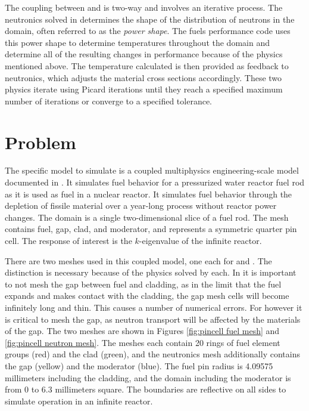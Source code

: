 The coupling between \rattlesnake{} and \bison{} is two-way and involves an iterative process.  The neutronics
solved in \rattlesnake{} determines the shape of the distribution of neutrons in the domain, often referred to
as the \emph{power shape}.  The fuels performance code uses this power shape to determine temperatures
throughout the domain and determine all of the resulting changes in performance because of the physics
mentioned above.  The temperature calculated is then provided as feedback to neutronics, which adjusts the
material cross sections accordingly.  These two physics iterate using Picard iterations until they reach a
specified maximum number of iterations or converge to a specified tolerance.

\section{Problem}

The specific model to simulate is a coupled multiphysics engineering-scale model documented in \cite{physormammoth}.  
It simulates fuel behavior for a pressurized
water reactor fuel rod as it is used as fuel in a nuclear reactor.  It simulates fuel behavior through the 
depletion of fissile material over a year-long process without reactor power changes.
The domain is a single two-dimensional slice of a fuel rod.  The mesh contains fuel, gap, clad, and
moderator, and represents a symmetric quarter pin cell.  
The response of interest is the $k$-eigenvalue of the infinite reactor.

There are two meshes used in this coupled model, one each for \bison{} and \rattlesnake{}.  The distinction is
necessary because of the physics solved by each.  In \bison{} it is important to not mesh the gap between fuel
and cladding, as in the limit that the fuel expands and makes contact with the cladding, the gap mesh cells
will become infinitely long and thin.  This causes a number of numerical errors.  For \rattlesnake{} however
it is critical to mesh the gap, as neutron transport will be affected by the materials of the gap.  The two
meshes are shown in Figures \ref{fig:pincell fuel mesh} and \ref{fig:pincell neutron mesh}.
The meshes each contain 20 rings of fuel element groups (red) and the clad (green),
and the neutronics mesh additionally contains the gap (yellow) and the moderator (blue).  
The fuel pin radius is 4.09575 millimeters including the cladding, and the domain including the moderator is
from 0 to 6.3 millimeters square.  The boundaries are reflective on all sides to simulate operation in an
infinite reactor.

